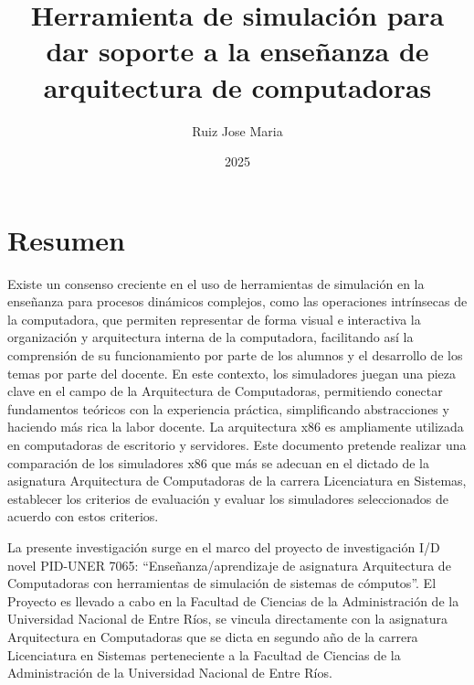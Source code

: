 \documentclass[12pt,oneside]{templates/unerthesis}
\title{Herramienta de simulación para dar soporte a la enseñanza de arquitectura de computadoras}
\author{Ruiz Jose Maria}
\date{2025}
\begin{document}
%
%

  \maketitle

\frontmatter %
\pagestyle{empty} %



  \setcounter{tocdepth}{1}
  \setlength{\parskip}{0pt}
  \tableofcontents

\setlength\parskip{1em plus 0.1em minus 0.2em}

  \listoftables

  \listoffigures



\mainmatter %
\pagestyle{fancyplain} %

\hypertarget{resumen}{%
\chapter*{Resumen}\label{resumen}}

Existe un consenso creciente en el uso de herramientas de simulación en la enseñanza para procesos dinámicos complejos, como las operaciones intrínsecas de la computadora, que permiten representar de forma visual e interactiva la organización y arquitectura interna de la computadora, facilitando así la comprensión de su funcionamiento por parte de los alumnos y el desarrollo de los temas por parte del docente. En este contexto, los simuladores juegan una pieza clave en el campo de la Arquitectura de Computadoras, permitiendo conectar fundamentos teóricos con la experiencia práctica, simpliﬁcando abstracciones y haciendo más rica la labor docente.
La arquitectura x86 es ampliamente utilizada en computadoras de escritorio y servidores. Este documento pretende realizar una comparación de los simuladores x86 que más se adecuan en el dictado de la asignatura Arquitectura de Computadoras de la carrera Licenciatura en Sistemas, establecer los criterios de evaluación y evaluar los simuladores seleccionados de acuerdo con estos criterios.

La presente investigación surge en el marco del proyecto de investigación I/D novel PID-UNER 7065: ``Enseñanza/aprendizaje de asignatura Arquitectura de Computadoras con herramientas de simulación de sistemas de cómputos''. El Proyecto es llevado a cabo en la Facultad de Ciencias de la Administración de la Universidad Nacional de Entre Ríos, se vincula directamente con la asignatura Arquitectura en Computadoras que se dicta en segundo año de la carrera Licenciatura en Sistemas perteneciente a la Facultad de Ciencias de la Administración de la Universidad Nacional de Entre Ríos.
\end{document}
